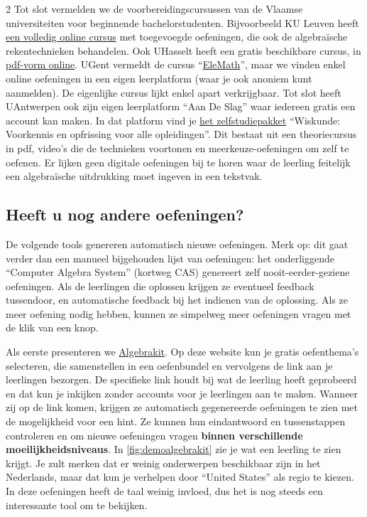 \begin{multicols} {2}
    Tot slot vermelden we de voorbereidingscursussen van de Vlaamse universiteiten voor beginnende bachelorstudenten.
    Bijvoorbeeld KU Leuven heeft \href{https://set.kuleuven.be/voorkennis/zomercursus/zomercursusZ/rekenen/breuken}{een volledig online cursus} met toegevoegde oefeningen, die ook de algebraïsche rekentechnieken behandelen.
    Ook UHasselt heeft een gratis beschikbare cursus, in \href{https://sites.google.com/uhasselt.be/platformwiskunde/leerplatform/leerboek/algebra-en-getaltheorie/veeltermen/veeltermen-tot-graad-2}{pdf-vorm online}.
    UGent vermeldt de cursus ``\href{https://elemath.ugent.be/}{EleMath}'', maar we vinden enkel online oefeningen in een eigen leerplatform (waar je ook anoniem kunt aanmelden).
    De eigenlijke cursus lijkt enkel apart verkrijgbaar.
    Tot slot heeft UAntwerpen ook zijn eigen leerplatform ``Aan De Slag'' waar iedereen gratis een account kan maken.
    In dat platform vind je \href{https://www.uantwerpen.be/nl/projecten/aan-de-slag/zelfstudiepakketten/}{het zelfstudiepakket} ``Wiskunde: Voorkennis en opfrissing voor alle opleidingen''.
    Dit bestaat uit een theoriecursus in pdf, video's die de technieken voortonen en meerkeuze-oefeningen om zelf te oefenen.
    Er lijken geen digitale oefeningen bij te horen waar de leerling feitelijk een algebraïsche uitdrukking moet ingeven in een tekstvak.

    \subsection{Heeft u nog andere oefeningen?}
    De volgende tools genereren automatisch nieuwe oefeningen.
    Merk op: dit gaat verder dan een manueel bijgehouden lijst van oefeningen: het onderliggende ``Computer Algebra System'' (kortweg CAS) genereert zelf nooit-eerder-geziene oefeningen.
    Als de leerlingen die oplossen krijgen ze eventueel feedback tussendoor, en automatische feedback bij het indienen van de oplossing.
    Als ze meer oefening nodig hebben, kunnen ze simpelweg meer oefeningen vragen met de klik van een knop.

    Als eerste presenteren we \href{https://practice.algebrakit.com/nl-BE/overview}{Algebrakit}.    
    Op deze website kun je gratis oefenthema's selecteren, die samenstellen in een oefenbundel en vervolgens de link aan je leerlingen bezorgen.
    De specifieke link houdt bij wat de leerling heeft geprobeerd en dat kun je inkijken zonder accounts voor je leerlingen aan te maken.
    Wanneer zij op de link komen, krijgen ze automatisch gegenereerde oefeningen te zien met de mogelijkheid voor een hint.
    Ze kunnen hun eindantwoord en tussenstappen controleren en om nieuwe oefeningen vragen \textbf{binnen verschillende moeilijkheidsniveaus}.
    In \autoref{fig:demoalgebrakit} zie je wat een leerling te zien krijgt.
    Je zult merken dat er weinig onderwerpen beschikbaar zijn in het Nederlands, maar dat kun je verhelpen door ``United States'' als regio te kiezen.
    In deze oefeningen heeft de taal weinig invloed, dus het is nog steeds een interessante tool om te bekijken.
    

\end{multicols}
